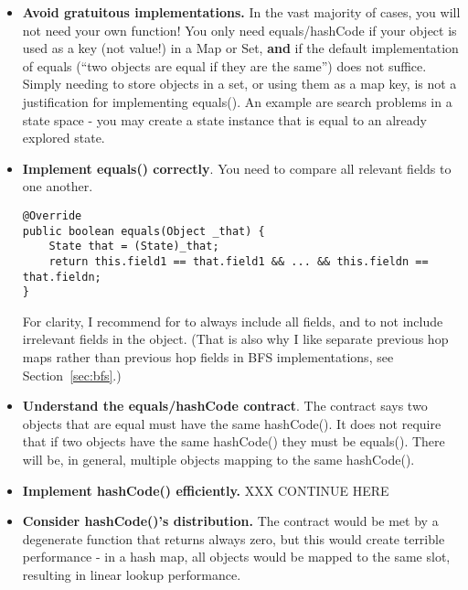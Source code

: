 \begin{itemize}
\item \textbf{Avoid gratuitous implementations.}  In the vast majority of cases,
you will not need your own  function!  You only need equals/hashCode
if your object is used as a key (not value!) in a Map or Set, \textbf{and} if the
default implementation of equals (``two objects are equal if they are the same'') does
not suffice.   Simply needing to store objects in a set, or using them as a map key,
is not a justification for implementing equals().
An example are search problems in a state space - you may create a 
state instance that is equal to an already explored state.

\item \textbf{Implement equals() correctly}.
You need to compare all relevant fields to one another.
\begin{verbatim}
@Override
public boolean equals(Object _that) {
    State that = (State)_that;
    return this.field1 == that.field1 && ... && this.fieldn == that.fieldn;
}
\end{verbatim}
For clarity, I recommend for  to always include all fields, and 
to not include irrelevant fields in the object.  (That is also why I like separate
previous hop maps rather than previous hop fields in BFS implementations,
see Section~\ref{sec:bfs}.)

\item \textbf{Understand the equals/hashCode contract}.
The contract says two objects that are equal must have the same hashCode().
It does not require that if two objects have the same hashCode() they must
be equals().  There will be, in general, multiple objects mapping to the
same hashCode().

\item \textbf{Implement hashCode() efficiently.} 
XXX CONTINUE HERE

\item \textbf{Consider hashCode()'s distribution.} 
The contract would be met by a degenerate function that returns always zero, but this
would create terrible performance - in a hash map, all objects would be mapped
to the same slot, resulting in linear lookup performance.

\end{itemize}

